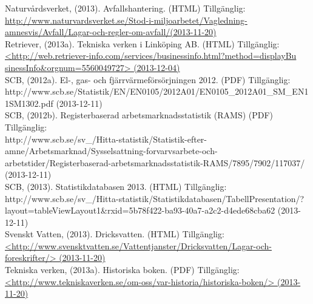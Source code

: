 \documentclass[10pt,a4paper]{article}
\begin{document}
Naturvårdsverket, (2013). Avfallshantering. (HTML) Tillgänglig: \\
\hyperref{http://www.naturvardsverket.se/Stod-i-miljoarbetet/Vagledning-amnesvis/Avfall/Lagar-och-regler-om-avfall/}{}{}{http://www.naturvardsverket.se/Stod-i-miljoarbetet/Vagledning-amnesvis/Avfall/Lagar-och-regler-om-avfall/(2013-11-20)}\\

Retriever, (2013a). Tekniska verken i Linköping AB. (HTML) Tillgänglig: \\
\hyperref{http://web.retriever-info.com/services/businessinfo.html?method=displayBusinessInfo\&orgnum=5560049727}{}{}{<http://web.retriever-info.com/services/businessinfo.html?method=displayBu\\sinessInfo\&orgnum=5560049727> (2013-12-04)}\\

SCB, (2012a). El-, gas- och fjärrvärmeförsörjningen 2012. (PDF) Tillgänglig:\\
http://www.scb.se/Statistik/EN/EN0105/2012A01/EN0105\_2012A01\_SM\_EN11SM1302.pdf (2013-12-11)\\

SCB, (2012b). Registerbaserad arbetsmarknadsstatistik (RAMS) (PDF) Tillgänglig:\\
http://www.scb.se/sv\_/Hitta-statistik/Statistik-efter-amne/Arbetsmarknad/Sysselsattning-forvarvsarbete-och-arbetstider/Registerbaserad-arbetsmarknadsstatistik-RAMS/7895/7902/117037/ (2013-12-11)\\

SCB, (2013). Statistikdatabasen 2013. (HTML) Tillgänglig:\\
http://www.scb.se/sv\_/Hitta-statistik/Statistikdatabasen/TabellPresentation/?\\layout=tableViewLayout1\&rxid=5b78f422-ba93-40a7-a2c2-d4ede68cba62 (2013-12-11)\\

Svenskt Vatten, (2013). Dricksvatten. (HTML) Tillgänglig: \\
\hyperref{http://www.svensktvatten.se/Vattentjanster/Dricksvatten/Lagar-och-foreskrifter/}{}{}{<http://www.svensktvatten.se/Vattentjanster/Dricksvatten/Lagar-och-foreskrifter/>
(2013-11-20)} \\

Tekniska verken, (2013a). Historiska boken. (PDF) Tillgänglig: \\
\hyperref{http://www.tekniskaverken.se/om-oss/var-historia/historiska-boken/}{}{}{<http://www.tekniskaverken.se/om-oss/var-historia/historiska-boken/> (2013-11-20)}\\
\end{document}
